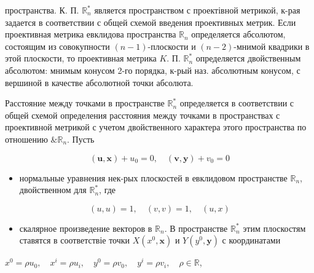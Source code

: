 \documentclass[10pt]{article}
\begin{document}
пространства. К. П. $\mathbb{R}_{n}^{*}$ является пространством с проектівной метрикой, к-рая задается в соответствии с общей схемой введения проективных метрик. Если проективная метрика евклидова пространства $\mathbb{R}_{n}$ определяется абсолютом, состоящим из совокупности $(n-1)$-плоскости и $(n-2)$-мнимой квадрики в этой плоскости, то проективная метрика $K$. П. $\mathbb{R}_{n}^{*}$ определяется двойственным абсолютом: мнимым конусом 2-го порядка, к-рый наз. абсолютным конусом, с вершиной в качестве абсолютной точки абсолюта.



Расстояние между точками в пространстве $\mathbb{R}_{n}^{*}$ определяется в соответствии с общей схемой определения расстояния между точками в пространствах с проективной метрикой с учетом двойственного характера этого пространства по отношению $\& \mathbb{R}_{n}$. Пусть



\[

(\boldsymbol{u}, \boldsymbol{x})+u_{0}=0, \quad(\boldsymbol{v}, \boldsymbol{y})+v_{0}=0

\]



\begin{itemize}

  \item нормальные уравнения нек-рых плоскостей в евклидовом пространстве $\mathbb{R}_{n}$, двойственном для $\mathbb{R}_{n}^{*}$, где

\end{itemize}



\[

(u, u)=1, \quad(v, v)=1, \quad(u, x)

\]



\begin{itemize}

  \item скалярное произведение векторов в $\mathbb{R}_{n}$. В пространстве $\mathbb{R}_{n}^{*}$ этим плоскостям ставятся в соответствіе точки $X\left(x^{0}, \boldsymbol{x}\right)$ и $Y\left(y^{0}, \boldsymbol{y}\right)$ с координатами

\end{itemize}



$x^{0}=\rho u_{0}, \quad x^{i}=\rho u_{i}, \quad y^{0}=\rho v_{0}, \quad y^{i}=\rho v_{i}, \quad \rho \in \mathbb{R}$,
\end{document}
